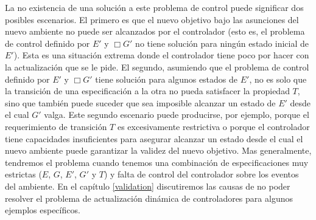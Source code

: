 La no existencia de una solución a este problema de control puede significar dos posibles escenarios. El primero es que
el nuevo objetivo bajo las asunciones del nuevo ambiente no puede ser alcanzados por el controlador (esto es, el
problema de control definido por $E'$ y $\Box G'$ no tiene solución para ningún estado inicial de $E'$). Esta es una
situación extrema donde el controlador tiene poco por hacer con la actualización que se le pide. El segundo, asumiendo
que el problema de control definido por $E'$ y $\Box G'$ tiene solución para algunos estados de $E'$, no es solo que la
transición de una especificación a la otra no pueda satisfacer la propiedad $T$, sino que también puede suceder que sea
imposible alcanzar un estado de $E'$ desde el cual $G'$ valga. Este segundo escenario puede producirse, por ejemplo,
porque el requerimiento de transición $T$ es excesivamente restrictiva o porque el controlador tiene capacidades
insuficientes para asegurar alcanzar un estado desde el cual el nuevo ambiente puede garantizar la validez del nuevo
objetivo. Mas generalmente, tendremos el problema cuando tenemos una combinación de especificaciones muy estrictas ($E$,
$G$, $E'$, $G'$ y $T$) y falta de control del controlador sobre los eventos del ambiente. En el capítulo \ref{validation}
discutiremos las causas de no poder resolver el problema de actualización dinámica de controladores para algunos
ejemplos específicos.
